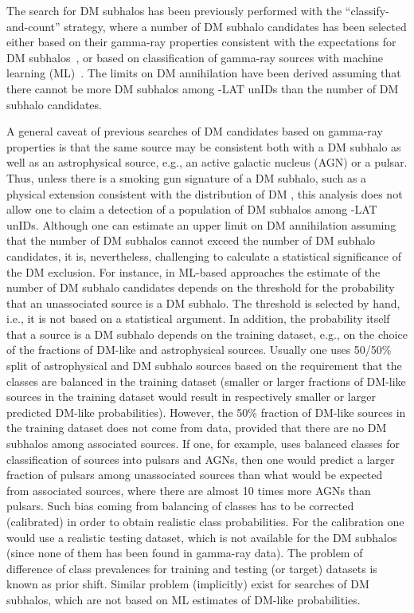 The search for DM subhalos has been previously performed with the ``classify-and-count'' strategy, where a number of DM subhalo candidates has been selected either based on their gamma-ray properties 
consistent with the expectations for DM subhalos~\DMsubhaloHand, or based on classification of gamma-ray sources with machine learning (ML)~\DMsubhaloML.
The limits on DM annihilation have been derived assuming that there cannot be more DM subhalos among \Fermi-LAT unIDs than the number of DM subhalo candidates.

A general caveat of previous searches of DM candidates based on gamma-ray properties is that the same source may be consistent both with a DM subhalo as well as an astrophysical source, e.g., an active galactic nucleus (AGN) or a pulsar.
Thus, unless there is a smoking gun signature of a DM subhalo, such as a physical extension consistent with the distribution of DM 
\cite{2014PhRvD..89a6014B, 2015JCAP...12..035B, 2017PhRvD..96f3009C, 2022PhRvD.105h3006C, 2019JCAP...11..045C}, this analysis does not allow one to claim a detection of a population of DM subhalos among \Fermi-LAT unIDs.
Although one can estimate an upper limit on DM annihilation assuming that the number of DM subhalos cannot exceed the number of DM subhalo candidates,
it is, nevertheless, challenging to calculate a statistical significance of the DM exclusion.
For instance, in ML-based approaches the estimate of the number of DM subhalo candidates depends on the threshold for the probability that an unassociated source is a DM subhalo.
The threshold is selected by hand, i.e., it is not based on a statistical argument. In addition, the probability itself that a source is a DM subhalo depends on the training dataset, e.g., on the choice of the fractions of DM-like and astrophysical sources. Usually one uses 50/50\% split of astrophysical and DM subhalo sources based on the requirement that the classes are balanced in the training dataset (smaller or larger fractions of DM-like sources in the training dataset would result in respectively smaller or larger predicted DM-like probabilities). However, the 50\% fraction of DM-like sources in the training dataset does not come from data, provided that there are no DM subhalos among associated sources. If one, for example, uses balanced classes for classification of sources into pulsars and AGNs, then one would predict a larger fraction of pulsars among unassociated sources
than what would be expected from associated sources, where there are almost 10 times more AGNs than pulsars. Such bias coming from balancing of classes has to be corrected (calibrated) in order to obtain realistic class probabilities.
For the calibration one would use a realistic testing dataset, which is not available for the DM subhalos (since none of them has been found in gamma-ray data).
The problem of difference of class prevalences for training and testing (or target) datasets is known as prior shift.
Similar problem (implicitly) exist for searches of DM subhalos, which are not based on ML estimates of DM-like probabilities.

